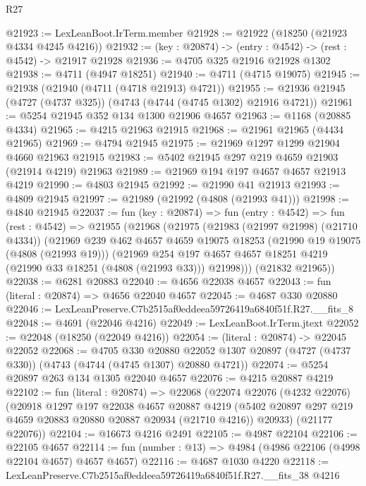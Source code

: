 \begin{lexlean}{R27}
\begin{coremodule}
@21923 := LexLeanBoot.IrTerm.member
@21928 := @21922 (@18250 (@21923 @4334 @4245 @4216))
@21932 := (key : @20874) -> (entry : @4542) -> (rest : @4542) -> @21917 @21928
@21936 := @4705 @325 @21916 @21928 @1302
@21938 := @4711 (@4947 @18251)
@21940 := @4711 (@4715 @19075)
@21945 := @21938 (@21940 (@4711 (@4718 @21913) @4721))
@21955 := @21936 @21945 (@4727 (@4737 @325)) (@4743 (@4744 (@4745 @1302) @21916 @4721))
@21961 := @5254 @21945 @352 @134 @1300 @21906 @4657
@21963 := @1168 (@20885 @4334)
@21965 := @4215 @21963 @21915
@21968 := @21961 @21965 (@4434 @21965)
@21969 := @4794 @21945
@21975 := @21969 @1297 @1299 @21904 @4660 @21963 @21915
@21983 := @5402 @21945 @297 @219 @4659 @21903 (@21914 @4219) @21963
@21989 := @21969 @194 @197 @4657 @4657 @21913 @4219
@21990 := @4803 @21945
@21992 := @21990 @41 @21913
@21993 := @4809 @21945
@21997 := @21989 (@21992 (@4808 (@21993 @41)))
@21998 := @4840 @21945
@22037 := fun (key : @20874) =>
  fun (entry : @4542) =>
  fun (rest : @4542) =>
  @21955
    (@21968
      (@21975
        (@21983 (@21997 @21998) (@21710 @4334))
        (@21969
          @239
          @462
          @4657
          @4659
          @19075
          @18253
          (@21990 @19 @19075 (@4808 (@21993 @19)))
          (@21969
            @254
            @197
            @4657
            @4657
            @18251
            @4219
            (@21990 @33 @18251 (@4808 (@21993 @33)))
            @21998)))
      (@21832 @21965))
@22038 := @6281 @20883
@22040 := @4656 @22038 @4657
@22043 := fun (literal : @20874) => @4656 @22040 @4657
@22045 := @4687 @330 @20880
@22046 := LexLeanPreserve.C7b2515af0eddeea59726419a6840f51f.R27.__fits_8
@22048 := @4691 (@22046 @4216)
@22049 := LexLeanBoot.IrTerm.jtext
@22052 := @22048 (@18250 (@22049 @4216))
@22054 := (literal : @20874) -> @22045 @22052
@22068 := @4705
    @330
    @20880
    @22052
    @1307
    @20897
    (@4727 (@4737 @330))
    (@4743 (@4744 (@4745 @1307) @20880 @4721))
@22074 := @5254 @20897 @263 @134 @1305 @22040 @4657
@22076 := @4215 @20887 @4219
@22102 := fun (literal : @20874) =>
  @22068
    (@22074
      @22076
      (@4232 @22076)
      (@20918
        @1297
        @197
        @22038
        @4657
        @20887
        @4219
        (@5402 @20897 @297 @219 @4659 @20883 @20880 @20887 @20934 (@21710 @4216))
        @20933)
      (@21177 @22076))
@22104 := @16673 @4216 @2491
@22105 := @4987 @22104
@22106 := @22105 @4657
@22114 := fun (number : @13) => @4984 (@4986 @22106 (@4998 @22104 @4657) @4657 @4657)
@22116 := @4687 @1030 @4220
@22118 := LexLeanPreserve.C7b2515af0eddeea59726419a6840f51f.R27.__fits_38 @4216

\end{coremodule}
\end{lexlean}
